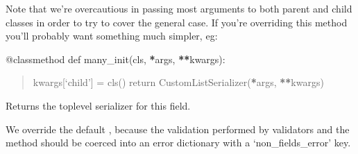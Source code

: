 \documentclass[letterpaper,10pt,english]{sphinxmanual}
\begin{document}
\begin{fulllineitems}
\begin{fulllineitems}
\sphinxAtStartPar
Note that we’re over\sphinxhyphen{}cautious in passing most arguments to both parent
and child classes in order to try to cover the general case. If you’re
overriding this method you’ll probably want something much simpler, eg:

\sphinxAtStartPar
@classmethod
def many\_init(cls, {\color{red}\bfseries{}*}args, {\color{red}\bfseries{}**}kwargs):
\begin{quote}

\sphinxAtStartPar
kwargs{[}‘child’{]} = cls()
return CustomListSerializer({\color{red}\bfseries{}*}args, {\color{red}\bfseries{}**}kwargs)
\end{quote}

\end{fulllineitems}


\begin{fulllineitems}
\label{\detokenize{tasks:tasks.serializers.TaskSerializer.root}}
\pysigstartsignatures
{}
\pysigstopsignatures
\sphinxAtStartPar
Returns the top\sphinxhyphen{}level serializer for this field.

\end{fulllineitems}


\begin{fulllineitems}
\label{\detokenize{tasks:tasks.serializers.TaskSerializer.run_validation}}
\pysigstartsignatures
{}
\pysigstopsignatures
\sphinxAtStartPar
We override the default , because the validation
performed by validators and the  method should
be coerced into an error dictionary with a ‘non\_fields\_error’ key.

\end{fulllineitems}



\end{fulllineitems}
\end{document}
